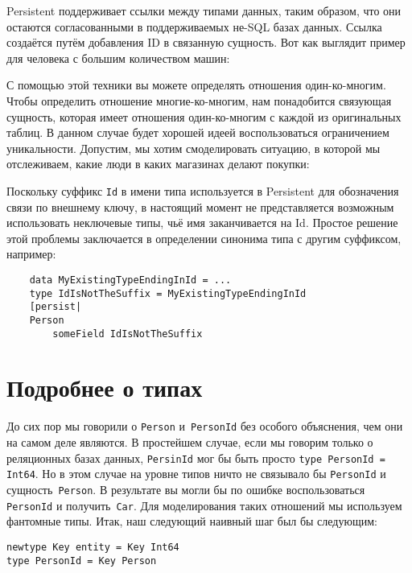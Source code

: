 Persistent поддерживает ссылки между типами данных, таким образом, что они
остаются согласованными в поддерживаемых не-SQL базах данных. Ссылка создаётся
путём добавления ID в связанную сущность. Вот как выглядит пример для человека
с большим количеством машин:


С помощью этой техники вы можете определять отношения один-ко-многим. Чтобы
определить отношение многие-ко-многим, нам понадобится связующая сущность,
которая имеет отношения один-ко-многим с каждой из оригинальных таблиц. В
данном случае будет хорошей идеей воспользоваться ограничением уникальности.
Допустим, мы хотим смоделировать ситуацию, в которой мы отслеживаем, какие люди
в каких магазинах делают покупки:


\begin{remark}
    Поскольку суффикс \lstinline'Id' в имени типа используется в Persistent для
    обозначения связи по внешнему ключу, в настоящий момент не представляется
    возможным использовать неключевые типы, чьё имя заканчивается на Id.
    Простое решение этой проблемы заключается в определении синонима типа с
    другим суффиксом, например:

    \begin{lstlisting}
    data MyExistingTypeEndingInId = ...
    type IdIsNotTheSuffix = MyExistingTypeEndingInId
    [persist|
    Person
        someField IdIsNotTheSuffix
    \end{lstlisting}
\end{remark}

\section{Подробнее о типах}

До сих пор мы говорили о \lstinline'Person' и~\lstinline'PersonId' без особого
объяснения, чем они на самом деле являются. В простейшем случае, если мы
говорим только о реляционных базах данных, \lstinline'PersinId' мог бы быть
просто \lstinline'type PersonId = Int64'. Но в этом случае на уровне типов
ничто не связывало бы \lstinline'PersonId' и сущность~\lstinline'Person'. В
результате вы могли бы по ошибке воспользоваться \lstinline'PersonId' и
получить~\lstinline'Car'. Для моделирования таких отношений мы используем
фантомные типы. Итак, наш следующий наивный шаг был бы следующим:

\begin{lstlisting}
newtype Key entity = Key Int64
type PersonId = Key Person
\end{lstlisting}

